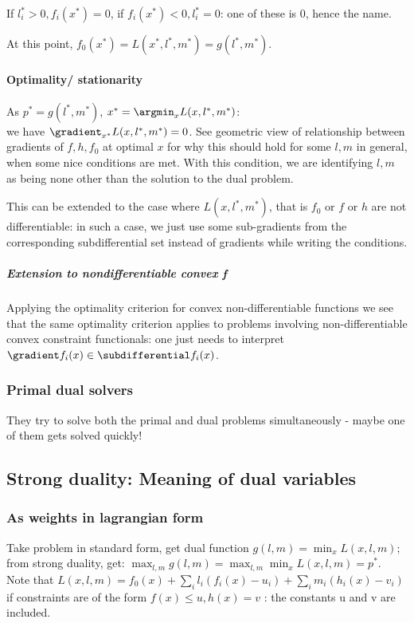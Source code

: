 \documentclass[oneside, article]{memoir}
\begin{document}
If $l_i ^{*}> 0, f_i(x^{*}) = 0$, if $f_i(x^{*})<0, l_i^{*} = 0$: one of these is 0, hence the name.
 
At this point, $f_0(x^{*}) = L(x^{*}, l^{*}, m^{*}) = g(l^{*}, m^{*})$.
 
\paragraph{Optimality/ stationarity}
As $p^{*} = g(l^{*}, m^{*})$, $x^{*} = \argmin_x L(x, l^{*}, m^{*})$: \\ we have $\gradient_{x^{*}}L(x, l^{*}, m^{*}) = 0$. See geometric view of relationship between gradients of $f, h, f_0$ at optimal $x$ for why this should hold for some $l, m$ in general, when some nice conditions are met. With this condition, we are identifying $l, m$ as being none other than the solution to the dual problem.

This can be extended to the case where $L(x, l^{*}, m^{*})$, that is $f_0$ or $f$ or $h$ are not differentiable: in such a case, we just use some sub-gradients from the corresponding subdifferential set instead of gradients while writing the conditions.

\subparagraph{Extension to nondifferentiable convex f}
Applying the optimality criterion for convex non-differentiable functions we see that the same optimality criterion applies to problems involving non-differentiable convex constraint functionals: one just needs to interpret $\gradient f_i(x) \in \subdifferential f_i(x)$.

\subsubsection{Primal dual solvers}
They try to solve both the primal and dual problems simultaneously - maybe one of them gets solved quickly!

\subsection{Strong duality: Meaning of dual variables}
\subsubsection{As weights in lagrangian form}
Take problem in standard form, get dual function $g(l, m) = \min_x L(x, l, m)$; from strong duality, get: $\max_{l, m} g(l, m) = \max_{l, m} \min_x L(x, l, m) = p^*$. Note that $L(x, l, m) = f_0(x) + \sum_i l_i(f_i(x) - u_i) + \sum_i m_i(h_i(x) - v_i)$ if constraints are of the form $f(x) \leq u, h(x) = v$ : the constants u and v are included.
\end{document}
